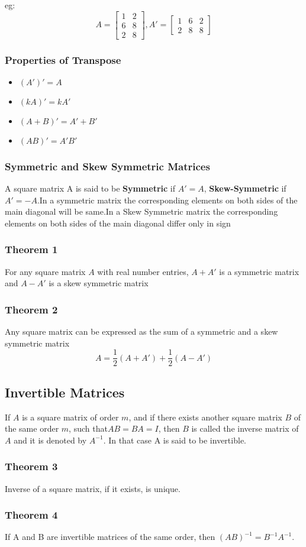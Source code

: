 \documentclass[12pt]{article}
\begin{document}
eg:$$A=\begin{bmatrix}
    1 &2  \\
    6 & 8 \\
    2 &8 
    \end{bmatrix}, A'=\begin{bmatrix}
        1 &6  &2\\
        2 & 8 & 8

        \end{bmatrix}$$
\subsubsection*{Properties of Transpose}
\begin{itemize}
    \item $(A')'=A$
    \item $(kA)'=kA'$
    \item $(A+B)'=A'+B'$
    \item $(AB)'=A'B'$
\end{itemize}

\subsubsection*{Symmetric and Skew Symmetric Matrices}
A square matrix A is said to be \textbf{Symmetric} if $A'=A$, \textbf{Skew-Symmetric} if $A'=-A$.In a symmetric matrix the corresponding elements on both sides of the main diagonal will be same.In a Skew Symmetric matrix the corresponding elements on both sides of the main diagonal differ only in sign

\subsubsection*{Theorem 1}
For any square matrix $A$ with real number entries, $A + A'$ is a symmetric
matrix and $A - A'$ is a skew symmetric matrix
\subsubsection*{Theorem 2}
Any square matrix can be expressed as the sum of a symmetric and a
skew symmetric matrix $$A=\frac{1}{2}(A+A')+\frac{1}{2}(A-A')$$

\subsection*{Invertible Matrices}
If $A$ is a square matrix of order $m$, and if there exists another square
matrix $B$ of the same order $m$, such that$ AB = BA = I$, then $B$ is called the inverse
matrix of $A$ and it is denoted by $A^{-1}$. In that case A is said to be invertible.

\subsubsection*{Theorem 3}
Inverse of a square matrix, if it exists, is unique.
\subsubsection*{Theorem 4}
If A and B are invertible matrices of the same order, then $(AB)^{-1} = B^{-1}A^{-1}$.
\end{document}
